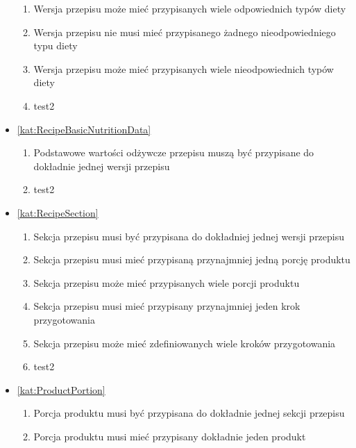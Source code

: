 \begin{itemize}[label={\textbf{Reguły dla}}, wide, labelwidth=!, labelindent=0pt]
\begin{enumerate}[label={\textbf{REG/\protect\threedigits{\arabic{enumi}}}}, wide, labelwidth=!, align=left, leftmargin=3cm, resume]
        \item Wersja przepisu może mieć przypisanych wiele odpowiednich typów diety
        \item Wersja przepisu nie musi mieć przypisanego żadnego nieodpowiedniego typu diety
        \item Wersja przepisu może mieć przypisanych wiele nieodpowiednich typów diety
        \item test2
    \end{enumerate}
    \item\ref{kat:RecipeBasicNutritionData}
    \begin{enumerate}[label={\textbf{REG/\protect\threedigits{\arabic{enumi}}}}, wide, labelwidth=!, align=left, leftmargin=3cm, resume]
        \item Podstawowe wartości odżywcze przepisu muszą być przypisane do dokładnie jednej wersji przepisu
        \item test2
    \end{enumerate}
    \item\ref{kat:RecipeSection}
    \begin{enumerate}[label={\textbf{REG/\protect\threedigits{\arabic{enumi}}}}, wide, labelwidth=!, align=left, leftmargin=3cm, resume]
        \item Sekcja przepisu musi być przypisana do dokładniej jednej wersji przepisu
        \item Sekcja przepisu musi mieć przypisaną przynajmniej jedną porcję produktu
        \item Sekcja przepisu może mieć przypisanych wiele porcji produktu
        \item Sekcja przepisu musi mieć przypisany przynajmniej jeden krok przygotowania
        \item Sekcja przepisu może mieć zdefiniowanych wiele kroków przygotowania
        \item test2
    \end{enumerate}
    \item\ref{kat:ProductPortion}
    \begin{enumerate}[label={\textbf{REG/\protect\threedigits{\arabic{enumi}}}}, wide, labelwidth=!, align=left, leftmargin=3cm, resume]
        \item Porcja produktu musi być przypisana do dokładnie jednej sekcji przepisu
        \item Porcja produktu musi mieć przypisany dokładnie jeden produkt

\end{enumerate}
\end{itemize}
